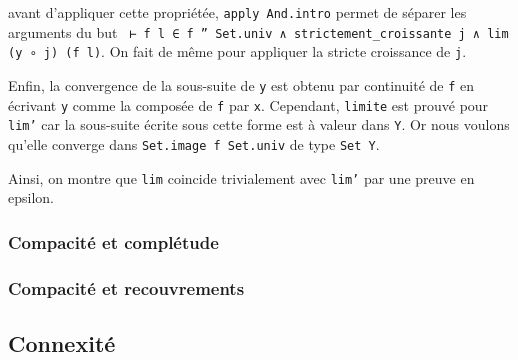 \documentclass[a4paper, 12pt]{article}
\newcommand{\lean}[1]{\texttt{#1}}
\begin{document}
avant d'appliquer cette propriétée, \lean{apply And.intro} permet de séparer les arguments du but \lean{ ⊢ f l ∈ f '' Set.univ ∧ strictement_croissante j ∧ lim (y ∘ j) (f l)}. On fait de même pour appliquer la stricte croissance de \lean{j}. 

Enfin, la convergence de la sous-suite de \lean{y} est obtenu par continuité de \lean{f} en écrivant \lean{y} comme la composée de \lean{f} par \lean{x}. Cependant, \lean{limite} est prouvé pour \lean{lim'} car la sous-suite écrite sous cette forme est à valeur dans \lean{Y}. Or nous voulons qu'elle converge dans \lean{Set.image f Set.univ} de type \lean{Set Y}.

Ainsi, on montre que \lean{lim} coincide trivialement avec \lean{lim'} par une preuve en epsilon.

\subsubsection{Compacité et complétude}
\subsubsection{Compacité et recouvrements}

\subsection{Connexité}

\newpage

\nocite{*}


\end{document}
